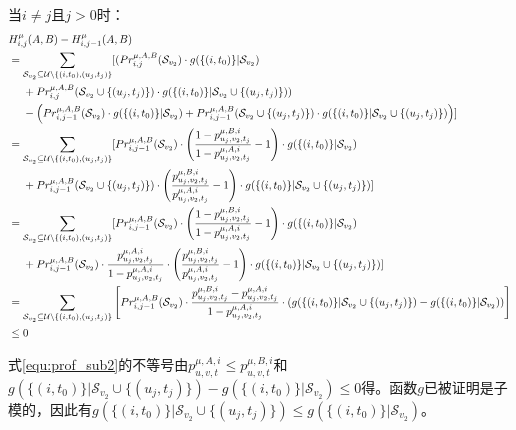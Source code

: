 当$i \ne j$且$j>0$时：
\begin{align}
\small
    &H_{i,j}^{\mu}(A,B)-H_{i,j-1}^{\mu}(A,B) \nonumber \\
    &=\sum_{\mathcal{S}_{v_2}\subseteq \mathcal{U} \setminus \{(i,t_0),(u_j,t_j)\}}[(Pr_{i,j}^{\mu,A,B}(\mathcal{S}_{v_2}) \cdot g(\{(i,t_0)\} |\mathcal{S}_{v_2}) \\
    &\ \ \ \ + Pr_{i,j}^{\mu,A,B}(\mathcal{S}_{v_2}\cup\{(u_j,t_j)\}) \cdot g(\{(i,t_0)\} |\mathcal{S}_{v_2}\cup \{(u_j,t_j)\})) \\ 
    &\ \ \ \ -\left(Pr_{i,j-1}^{\mu,A,B}(\mathcal{S}_{v_2}) \cdot g(\{(i,t_0)\} |\mathcal{S}_{v_2})+Pr_{i,j-1}^{\mu,A,B}(\mathcal{S}_{v_2}\cup\{(u_j,t_j)\}) \cdot g(\{(i,t_0)\} |\mathcal{S}_{v_2} \cup \{(u_j,t_j)\})\right)] \\ 
    &=\sum_{\mathcal{S}_{v_2}\subseteq \mathcal{U} \setminus \{(i,t_0),(u_j,t_j)\}}[Pr_{i,j-1}^{\mu,A,B}(\mathcal{S}_{v_2})\cdot \left(\frac{1-p_{u_j,v_2,t_j}^{\mu,B,i}}{1-p_{u_j,v_2,t_j}^{\mu,A,i}} - 1\right) \cdot g(\{(i,t_0)\} |\mathcal{S}_{v_2})\\
    &\ \ \ \ +Pr_{i,j-1}^{\mu,A,B}(\mathcal{S}_{v_2}\cup\{(u_j,t_j)\})\cdot \left(\frac{p_{u_j,v_2,t_j}^{\mu,B,i}}{p_{u_j,v_2,t_j}^{\mu,A,i}}-1\right) \cdot g(\{(i,t_0)\} |\mathcal{S}_{v_2} \cup \{(u_j,t_j)\})] \\  
    &=\sum_{\mathcal{S}_{v_2}\subseteq \mathcal{U} \setminus \{(i,t_0),(u_j,t_j)\}}[Pr_{i,j-1}^{\mu,A,B}(\mathcal{S}_{v_2})\cdot \left(\frac{1-p_{u_j,v_2,t_j}^{\mu,B,i}}{1-p_{u_j,v_2,t_j}^{\mu,A,i}} - 1\right) \cdot g(\{(i,t_0)\} |\mathcal{S}_{v_2})\\
    &\ \ \ \ +Pr_{i,j-1}^{\mu,A,B}(\mathcal{S}_{v_2})\cdot \frac{p_{u_j,v_2,t_j}^{\mu,A,i}}{1-p_{u_j,v_2,t_j}^{\mu,A,i}} \cdot \left(\frac{p_{u_j,v_2,t_j}^{\mu,B,i}}{p_{u_j,v_2,t_j}^{\mu,A,i}}-1\right) \cdot g(\{(i,t_0)\} |\mathcal{S}_{v_2}\cup \{(u_j,t_j)\})] \\
    &= \sum_{\mathcal{S}_{v_2}\subseteq \mathcal{U} \setminus \{(i,t_0),(u_j,t_j)\}}\left[Pr_{i,j-1}^{\mu,A,B}(\mathcal{S}_{v_2})\cdot \frac{p_{u_j,v_2,t_j}^{\mu,B,i}-p_{u_j,v_2,t_j}^{\mu,A,i}}{1-p_{u_j,v_2,t_j}^{\mu,A,i}} \cdot (g(\{(i,t_0)\} |\mathcal{S}_{v_2} \cup \{(u_j,t_j)\})-g(\{(i,t_0)\} |\mathcal{S}_{v_2}))\right] \\
    &\le 0 \label{equ:prof_sub2}
\end{align}

式\ref{equ:prof_sub2}的不等号由$p_{u,v,t}^{\mu,A,i} \le p_{u,v,t}^{\mu,B,i}$和$g(\{(i,t_0)\} |\mathcal{S}_{v_2} \cup \{(u_j,t_j)\})-g(\{(i,t_0)\} |\mathcal{S}_{v_2}) \le 0$得。函数$g$已被证明是子模的\cite{mrim}，因此有$g(\{(i,t_0)\} |\mathcal{S}_{v_2} \cup \{(u_j,t_j)\})\le g(\{(i,t_0)\} |\mathcal{S}_{v_2}) $。

